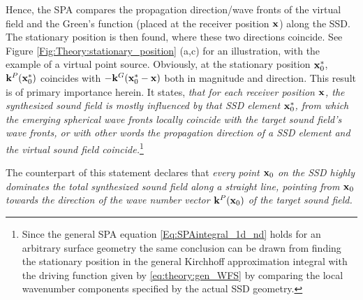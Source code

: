 Hence, the SPA compares the propagation direction/wave fronts of the virtual field and the Green’s function (placed at the receiver position $\mathbf{x}$) along the SSD.
The stationary position is then found, where these two directions coincide.
See Figure \ref{Fig:Theory:stationary_position} (a,c) for an illustration, with the example of a virtual point source.
Obviously, at the stationary position $\mathbf{x}_0^*$, $\mathbf{k}^P(\mathbf{x}_0^*)$ coincides with $-\mathbf{k}^G(\mathbf{x}_0^* - \mathbf{x} )$ both in magnitude and direction.
This result is of primary importance herein.
It states, \emph{that for each receiver position $\mathbf{x}$, the synthesized sound field is mostly influenced by that SSD element $\mathbf{x}_0^*$, from which the emerging spherical wave fronts locally coincide with the target sound field’s wave fronts, or with other words the propagation direction of a SSD element and the virtual sound field coincide.}\footnote{Since the general SPA equation \eqref{Eq:SPAintegral_1d_nd} holds for an arbitrary surface geometry the same conclusion can be drawn from finding the stationary position in the general Kirchhoff approximation integral with the driving function given by \eqref{eq:theory:gen_WFS} by comparing the local wavenumber components specified by the actual SSD geometry.}

The counterpart of this statement declares that \emph{every point $\mathbf{x}_0$ on the SSD highly dominates the total synthesized sound field along a straight line, pointing from $\mathbf{x}_0$ towards the direction of the wave number vector $\mathbf{k}^P(\mathbf{x}_0)$ of the target sound field.}
%



